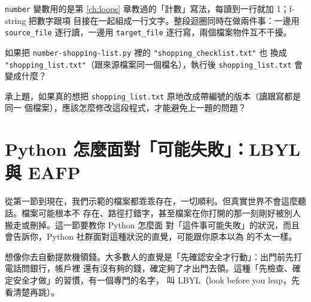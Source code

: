 
\texttt{number} 變數用的是第 \ref{ch:loops} 章教過的「計數」寫法，每讀到一行就加 1；f-string 把數字跟項
目接在一起組成一行文字。整段迴圈同時在做兩件事：一邊用 \texttt{source\_file} 逐行讀，一邊用
\texttt{target\_file} 逐行寫，兩個檔案物件互不干擾。


\begin{drills}[label=drills:multiple-files]
\item 如果把 \texttt{number-shopping-list.py} 裡的 \texttt{"shopping\_checklist.txt"} 也
換成 \texttt{"shopping\_list.txt"}（跟來源檔案同一個檔名），執行後 \texttt{shopping\_list.txt}
會變成什麼？
\item 承上題，如果真的想把 \texttt{shopping\_list.txt} 原地改成帶編號的版本（讀跟寫都是同一
個檔案），應該怎麼修改這段程式，才能避免上一題的問題？
\end{drills}

\section{Python 怎麼面對「可能失敗」：LBYL 與 EAFP}
\label{sec:lbyl-vs-eafp}

從第一節到現在，我們示範的檔案都乖乖存在，一切順利。但真實世界不會這麼聽話。檔案可能根本不
存在、路徑打錯字，甚至檔案在你打開的那一刻剛好被別人搬走或刪掉。這一節要教你 Python 怎麼面
對「這件事可能失敗」的狀況，而且會告訴你，Python 社群面對這種狀況的直覺，可能跟你原本以為
的不太一樣。

想像你去自動提款機領錢。大多數人的直覺是「先確認安全才行動」：出門前先打電話問銀行，帳戶裡
還有沒有夠的錢，確定夠了才出門去領。這種「先檢查、確定安全才做」的習慣，有一個專門的名字，
叫 LBYL（look before you leap，先看清楚再跳）。

